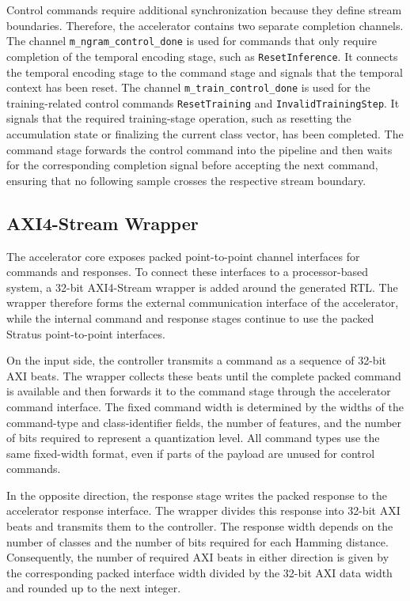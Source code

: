 Control commands require additional synchronization because they define stream boundaries. Therefore, the accelerator contains two separate completion channels. 
The channel \texttt{m\_ngram\_control\_done} is used for commands that only require completion of the temporal encoding stage, such as \texttt{ResetInference}. It connects the temporal encoding stage to the command stage and signals that the temporal context has been reset. The channel \texttt{m\_train\_control\_done} is used for the training-related control commands \texttt{ResetTraining} and \texttt{InvalidTrainingStep}. It signals that the required training-stage operation, such as resetting the accumulation state or finalizing the current class vector, has been completed. The command stage forwards the control command into the pipeline and then waits for the corresponding completion signal before accepting the next command, ensuring that no following sample crosses the respective stream boundary.

\subsection{AXI4-Stream Wrapper}
\label{sec:Axi}
The accelerator core exposes packed point-to-point channel interfaces for commands and responses. To connect these interfaces to a processor-based system, a 32-bit AXI4-Stream wrapper is added around the generated RTL. The wrapper therefore forms the external communication interface of the accelerator, while the internal command and response stages continue to use the packed Stratus point-to-point interfaces.

On the input side, the controller transmits a command as a sequence of 32-bit AXI beats. The wrapper collects these beats until the complete packed command is available and then forwards it to the command stage through the accelerator command interface. The fixed command width is determined by the widths of the command-type and class-identifier fields, the number of features, and the number of bits required to represent a quantization level. All command types use the same fixed-width format, even if parts of the payload are unused for control commands.

In the opposite direction, the response stage writes the packed response to the accelerator response interface. The wrapper divides this response into 32-bit AXI beats and transmits them to the controller. The response width depends on the number of classes and the number of bits required for each Hamming distance. Consequently, the number of required AXI beats in either direction is given by the corresponding packed interface width divided by the 32-bit AXI data width and rounded up to the next integer.

